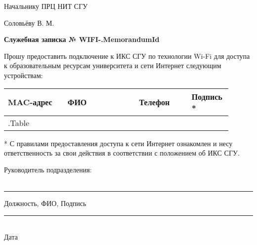 \documentclass[12pt]{article}
\begin{document}
\begin{flushright}
Начальнику ПРЦ НИТ СГУ

Соловьёву В. М. \\[50pt]
\end{flushright}

\begin{center}
\large
\textbf{Служебная записка № WIFI-{{.MemorandumId}} } \\[20pt]
\end{center}
\begin{flushleft}
\large
Прошу предоставить подключение к ИКС СГУ по технологии Wi-Fi для доступа к образовательным ресурсам университета и сети Интернет следующим устройствам:
\end{flushleft}




\begin{table}[!h]
\large
\centering
\label{my-label}
\begin{tabular}{|p{0.25\linewidth}|p{0.3\linewidth}|p{0.22\linewidth}|p{0.135\linewidth}|}
\hline
MAC-адрес & ФИО & Телефон & Подпись *  \\
\hline
{{.Table}}
\end{tabular}
\end{table}


\small
* С правилами предоставления доступа к сети Интернет ознакомлен и несу ответственность за свои действия в соответствии с положением об ИКС СГУ. \\[30pt]
\normalsize
\begin{flushleft}
\large
Руководитель подразделения:\\~\\
\end{flushleft}
\centering
\noindent\rule{550pt}{0.4pt}
\large
Должность, ФИО, Подпись\\[50pt]

\begin{flushright}
\normalsize
\noindent\rule{100pt}{0.4pt} \\
Дата           
\end{flushright}
\end{document}
